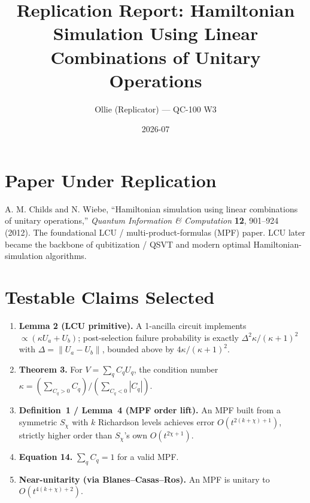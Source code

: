 \documentclass[11pt]{article}
\title{Replication Report: Hamiltonian Simulation Using Linear Combinations of Unitary Operations}
\author{Ollie (Replicator) --- QC-100 W3}
\date{2026-07}
\begin{document}
\maketitle

\section{Paper Under Replication}
A. M. Childs and N. Wiebe, ``Hamiltonian simulation using linear combinations of unitary operations,''
\emph{Quantum Information \& Computation} \textbf{12}, 901--924 (2012). The foundational
LCU / multi-product-formulas (MPF) paper. LCU later became the backbone of qubitization / QSVT
and modern optimal Hamiltonian-simulation algorithms.

\section{Testable Claims Selected}
\begin{enumerate}
  \item \textbf{Lemma 2 (LCU primitive).} A 1-ancilla circuit implements $\propto (\kappa U_a + U_b)$;
        post-selection failure probability is exactly $\Delta^2 \kappa/(\kappa+1)^2$ with
        $\Delta = \|U_a - U_b\|$, bounded above by $4\kappa/(\kappa+1)^2$.
  \item \textbf{Theorem 3.} For $V = \sum_q C_q U_q$, the condition number
        $\kappa = (\sum_{C_q>0} C_q) / (\sum_{C_q<0}|C_q|)$.
  \item \textbf{Definition~1 / Lemma~4 (MPF order lift).} An MPF built from a symmetric $S_\chi$
        with $k$ Richardson levels achieves error $O(t^{2(k+\chi)+1})$, strictly higher order than
        $S_\chi$'s own $O(t^{2\chi+1})$.
  \item \textbf{Equation 14.} $\sum_q C_q = 1$ for a valid MPF.
  \item \textbf{Near-unitarity (via Blanes--Casas--Ros).} An MPF is unitary to $O(t^{4(k+\chi)+2})$.
\end{enumerate}
\end{document}
